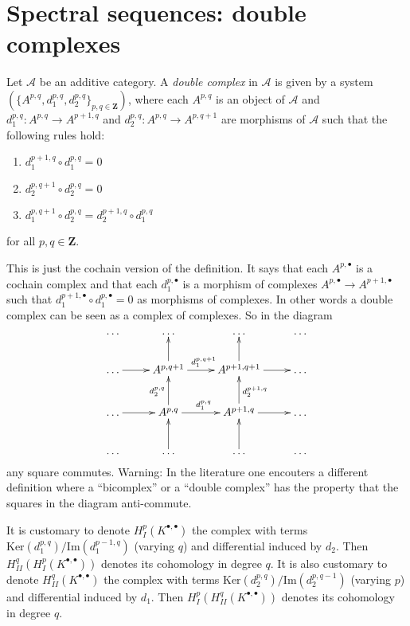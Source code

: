 \section{Spectral sequences: double complexes}
\label{section-double-complex}

\begin{definition}
\label{definition-double-complex}
Let $\mathcal{A}$ be an additive category.
A {\it double complex} in $\mathcal{A}$ is given
by a system $(\{A^{p, q}, d_1^{p, q}, d_2^{p, q}\}_{p, q\in \mathbf{Z}})$,
where each $A^{p, q}$ is an object of $\mathcal{A}$ and
$d_1^{p, q} : A^{p, q} \to A^{p + 1, q}$ and
$d_2^{p, q} : A^{p, q} \to A^{p, q + 1}$ are morphisms of $\mathcal{A}$
such that the following rules hold:
\begin{enumerate}
\item $d_1^{p + 1, q} \circ d_1^{p, q} = 0$
\item $d_2^{p, q + 1} \circ d_2^{p, q} = 0$
\item $d_1^{p, q + 1} \circ d_2^{p, q} = d_2^{p + 1, q} \circ d_1^{p, q}$
\end{enumerate}
for all $p, q \in \mathbf{Z}$.
\end{definition}

\noindent
This is just the cochain version of the definition.
It says that each $A^{p, \bullet}$ is a cochain complex
and that each $d_1^{p, \bullet}$ is a morphism of complexes
$A^{p, \bullet} \to A^{p + 1, \bullet}$ such that
$d_1^{p + 1, \bullet} \circ d_1^{p, \bullet} = 0$ as morphisms
of complexes. In other words a double complex can be seen as
a complex of complexes. So in the diagram
$$
\xymatrix{
\ldots &
\ldots &
\ldots &
\ldots \\
\ldots \ar[r] &
A^{p, q + 1} \ar[r]^{d_1^{p, q + 1}} \ar[u] &
A^{p + 1, q + 1} \ar[r] \ar[u] &
\ldots \\
\ldots \ar[r] &
A^{p, q} \ar[r]^{d_1^{p, q}} \ar[u]^{d_2^{p, q}} &
A^{p + 1, q} \ar[r] \ar[u]_{d_2^{p + 1, q}} &
\ldots \\
\ldots &
\ldots \ar[u] &
\ldots \ar[u] &
\ldots
}
$$
any square commutes.
Warning: In the literature one encouters a different definition
where a ``bicomplex'' or  a ``double complex'' has the property that
the squares in the diagram anti-commute.

\medskip\noindent
It is customary to denote $H^p_I(K^{\bullet, \bullet})$
the complex with terms $\text{Ker}(d_1^{p, q})/\text{Im}(d_1^{p - 1, q})$
(varying $q$) and differential induced by $d_2$.
Then $H^q_{II}(H^p_I(K^{\bullet, \bullet}))$ denotes its cohomology in
degree $q$. It is also customary to denote $H^q_{II}(K^{\bullet, \bullet})$
the complex with terms $\text{Ker}(d_2^{p, q})/\text{Im}(d_2^{p, q - 1})$
(varying $p$) and differential induced by $d_1$.
Then $H^p_I(H^q_{II}(K^{\bullet, \bullet}))$ denotes its cohomology in
degree $q$.

